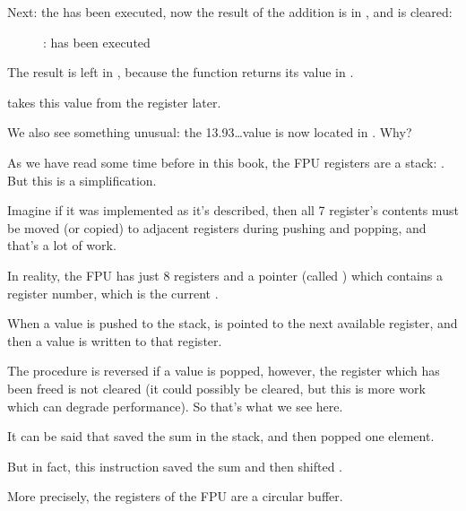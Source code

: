 \clearpage
Next: the \FADDP has been executed, now the result of the addition is in , and  is cleared:

\begin{figure}[H]
\centering
{}
\caption{\olly: \FADDP has been executed}
\label{fig:FPU_simple_olly_5}
\end{figure}

The result is left in , because the function returns its value in .

\main takes this value from the register later.

We also see something unusual: the 13.93\ldots value is now located in .
Why?

\label{FPU_is_rather_circular_buffer}

As we have read some time before in this book, the \ac{FPU} registers are a stack: . 
But this is a simplification.

Imagine if it was implemented  as it's described, then all 7 register's
contents must be moved (or copied) to adjacent registers during pushing and popping, 
and that's a lot of work.

In reality, the \ac{FPU} has just 8 registers and a pointer (called ) which contains a register number,
which is the current .

When a value is pushed to the stack,  is pointed to the next available register,
and then a value is written to that register.

The procedure is reversed if a value is popped, however, the register which has been freed is not cleared
(it could possibly be cleared, but this is more work which can degrade performance).
So that's what we see here. 

It can be said that \FADDP saved the sum in the stack, and then popped one element.

But in fact, this instruction saved the sum and then shifted .

More precisely, the registers of the \ac{FPU} are a circular buffer.
